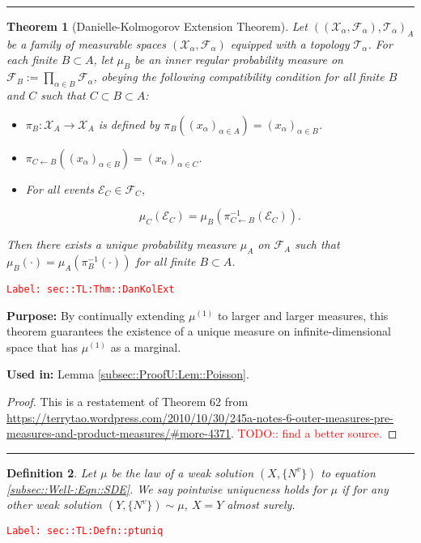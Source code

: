 \documentclass[12pt]{article}
\newcommand{\mc}{\mathcal}
\newcommand{\ra}{\rightarrow}
\newcommand{\tr}{\textcolor{red}}
\newcommand{\labe}[1]{\tr{\texttt{Label: #1}}}
\newcommand{\purpose}{\textbf{Purpose: }}
\newcommand{\usein}{\textbf{Used in: }}
\newcommand{\lin}{\rule{\linewidth}{0.4 pt}}
\newcommand{\defeq}{:=}								%
\renewcommand{\v}{v}							%
\newcommand{\x}{x}								%
\newcommand{\proj}{\pi}							%
\newcommand{\F}{\mc{F}}							%
\newcommand{\X}{X}								%
\newcommand{\vind}[1]{^{#1}}					%
\newcommand{\sln}[1]{^{(#1)}}					%
\newcommand{\poiss}{N}							%
\newcommand{\indx}[1]{_{#1}}					%
\newcommand{\m}{\mu}							%
\newcommand{\XX}{Y}								%
\newcommand{\evnt}{\mc{E}}						%
\newcommand{\spce}{\mc{X}}						%
\newcommand{\topo}{\mc{T}}						%
\newcommand{\indxset}[1]{_{#1}}					%
\newtheorem{thms}{Theorem}[section]
\newtheorem{defn}[thms]{Definition}
\begin{document}
\lin
\begin{thms}[Danielle-Kolmogorov Extension Theorem]
Let \(((\spce\indx{\alpha},\F\indx{\alpha}),\topo\indx{\alpha})\indxset{A}\) be a family of measurable spaces \((\spce\indx{\alpha},\F\indx{\alpha})\) equipped with a topology \(\topo\indx{\alpha}\). For each finite \(B \subset A\), let \(\m\indxset{B}\) be an inner regular probability measure on \(\F\indxset{B} \defeq \prod_{\alpha\in B} \F\indx{\alpha}\), obeying the following compatibility condition for all finite \(B\) and \(C\) such that \(C \subset B\subset A\):

\begin{itemize}
\item \(\proj\indxset{B}: \spce\indxset{A} \ra \spce\indxset{A}\) is defined by \(\proj\indxset{B}\left((\x\indx{\alpha})\indxset{\alpha\in A}\right) = (\x\indx{\alpha})\indxset{\alpha\in B}\).

\item \(\proj\indxset{C\leftarrow B}\left((\x\indx{\alpha})\indxset{\alpha \in B}\right) = (\x\indx{\alpha})\indxset{\alpha \in C}\).

\item For all events \(\evnt\indxset{C} \in \F\indxset{C}\),

\[\m\indxset{C}(\evnt\indxset{C}) = \m\indxset{B}\left(\proj\indxset{C\leftarrow B}^{-1}(\evnt\indxset{C})\right).\]
\end{itemize}

Then there exists a unique probability measure \(\m\indxset{A}\) on \(\F\indxset{A}\) such that \(\m\indxset{B}(\cdot) = \m\indxset{A}\left(\proj\indxset{B}^{-1}(\cdot)\right)\) for all finite \(B \subset A\).
\label{sec::TL:Thm::DanKolExt}
\end{thms}
\labe{sec::TL:Thm::DanKolExt}

\purpose By continually extending \(\m\sln{1}\) to larger and larger measures, this theorem guarantees the existence of a unique measure on infinite-dimensional space that has \(\m\sln{1}\) as a marginal.

\usein Lemma \ref{subsec::ProofU:Lem::Poisson}.

\begin{proof}
This is a restatement of Theorem 62 from \url{https://terrytao.wordpress.com/2010/10/30/245a-notes-6-outer-measures-pre-measures-and-product-measures/#more-4371}. \tr{TODO:: find a better source.}
\end{proof}

\lin

\begin{defn}
Let \(\mu\) be the law of a weak solution \((\X,\{\poiss\vind{\v}\})\) to equation \eqref{subsec::Well-:Eqn::SDE}. We say pointwise uniqueness holds for \(\mu\) if for any other weak solution \((\XX,\{\poiss\vind{\v}\})\sim \mu\), \(\X = \XX\) almost surely.

\label{sec::TL:Defn::ptuniq}
\end{defn}
\labe{sec::TL:Defn::ptuniq}
\end{document}
